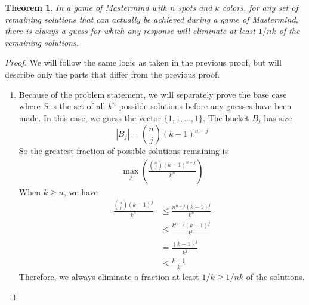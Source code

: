 \documentclass[12pt, a4paper]{article}
\newtheorem{theorem}{Theorem}
\begin{document}
	\begin{theorem}
	In a game of Mastermind with $n$ spots and $k$ colors, for any set of remaining
	solutions that can actually be achieved during a game of Mastermind,
	there is always a guess for which any response will eliminate at least
	$1/nk$ of the remaining solutions.
	\end{theorem}
	\begin{proof}
	We will follow the same logic as taken in the previous proof, but will describe
	only the parts that differ from the previous proof.
		\begin{enumerate}
		\item Because of the problem statement, we will separately prove the base
		case where $S$ is the set of all $k^n$ possible solutions before any guesses
		have been made. In this case, we guess the vector $\{1, 1, \ldots, 1\}$. The
		bucket $B_j$ has size
			\begin{equation*}
			|B_j| = \binom{n}{j}(k-1)^{n-j}
			\end{equation*}
		So the greatest fraction of possible solutions remaining is
			\begin{align*}
			\max_{j}\left(\frac{\binom{n}{j}(k-1)^{n-j}}{k^n}\right)
			\end{align*}
		When $k\ge n$, we have
			\begin{align*}
			\frac{\binom{n}{j}(k-1)^j}{k^n}
			& \le \frac{n^{n-j}(k-1)^j}{k^n}\\
			& \le \frac{k^{n-j}(k-1)^j}{k^n}\\
			& = \frac{(k-1)^j}{k^j}\\
			& \le \frac{k-1}{k}
			\end{align*}
		Therefore, we always eliminate a fraction at least $1/k\ge 1/nk$ of the
		solutions.
		

\end{enumerate}
\end{proof}
\end{document}
